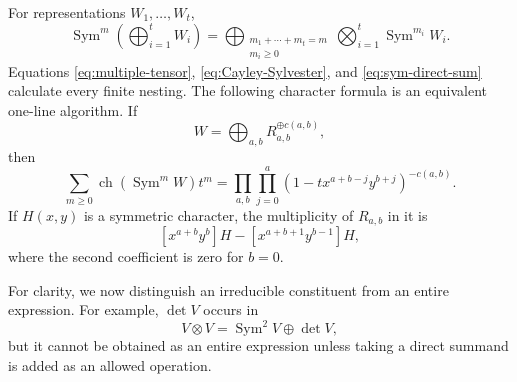 \documentclass[11pt,reqno]{amsart}
\theoremstyle{definition}
\theoremstyle{remark}
\newcommand{\Sym}{\operatorname{Sym}}
\newcommand{\ch}{\operatorname{ch}}
\begin{document}
For representations $W_1,\ldots,W_t$,
\begin{equation}\label{eq:sym-direct-sum}
 \Sym^m\left(\bigoplus_{i=1}^{t}W_i\right)
 =
 \bigoplus_{\substack{m_1+\cdots+m_t=m\\m_i\geq0}}
 \bigotimes_{i=1}^{t}\Sym^{m_i}W_i.
\end{equation}
Equations \eqref{eq:multiple-tensor}, \eqref{eq:Cayley-Sylvester}, and
\eqref{eq:sym-direct-sum} calculate every finite nesting.  The following
character formula is an equivalent one-line algorithm.  If
\begin{equation*}
 W=\bigoplus_{a,b}R_{a,b}^{\oplus c(a,b)},
\end{equation*}
then
\begin{equation}\label{eq:character-generating}
 \sum_{m\geq0}\ch(\Sym^mW)t^m
 =
 \prod_{a,b}\prod_{j=0}^{a}
 \left(1-tx^{a+b-j}y^{b+j}\right)^{-c(a,b)}.
\end{equation}
If $H(x,y)$ is a symmetric character, the multiplicity of $R_{a,b}$ in it is
\begin{equation}\label{eq:character-extraction}
 [x^{a+b}y^b]H-[x^{a+b+1}y^{b-1}]H,
\end{equation}
where the second coefficient is zero for $b=0$.

For clarity, we now distinguish an irreducible constituent from an entire
expression.  For example, $\det V$ occurs in
\begin{equation*}
 V\otimes V=\Sym^2V\oplus\det V,
\end{equation*}
but it cannot be obtained as an entire expression unless taking a direct
summand is added as an allowed operation.
\end{document}
